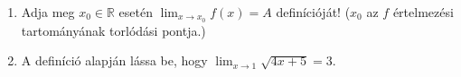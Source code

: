 \documentclass[11pt]{scrartcl}
\begin{document}
\begin{enumerate}
	\item Adja meg $x_0 \in \mathbb{R}$ esetén $\lim_{x \to x_0} f(x) = A$
	      definícióját! ($x_0$ az $f$ értelmezési tartományának torlódási
	      pontja.)

	\item A definíció alapján lássa be, hogy
	      $\lim_{x \to 1} \sqrt{4x + 5} = 3$.
\end{enumerate}
\end{document}
